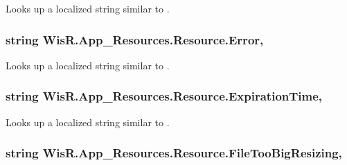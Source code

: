 Looks up a localized string similar to . 

\hypertarget{class_wis_r_1_1_app___resources_1_1_resource_a4486cffa4a7434f0dc98372bc596a455}{}
\subsubsection[{Error}]{\setlength{\rightskip}{0pt plus 5cm}string Wis\+R.\+App\+\_\+\+Resources.\+Resource.\+Error\hspace{0.3cm}{\ttfamily [static]}, {\ttfamily [get]}}\label{class_wis_r_1_1_app___resources_1_1_resource_a4486cffa4a7434f0dc98372bc596a455}


Looks up a localized string similar to . 

\hypertarget{class_wis_r_1_1_app___resources_1_1_resource_ab66b631e7db04b7054b799b76a04b245}{}
\subsubsection[{Expiration\+Time}]{\setlength{\rightskip}{0pt plus 5cm}string Wis\+R.\+App\+\_\+\+Resources.\+Resource.\+Expiration\+Time\hspace{0.3cm}{\ttfamily [static]}, {\ttfamily [get]}}\label{class_wis_r_1_1_app___resources_1_1_resource_ab66b631e7db04b7054b799b76a04b245}


Looks up a localized string similar to . 

\hypertarget{class_wis_r_1_1_app___resources_1_1_resource_ac60ef8ccb4d4d925c67924e267a752bd}{}
\subsubsection[{File\+Too\+Big\+Resizing}]{\setlength{\rightskip}{0pt plus 5cm}string Wis\+R.\+App\+\_\+\+Resources.\+Resource.\+File\+Too\+Big\+Resizing\hspace{0.3cm}{\ttfamily [static]}, {\ttfamily [get]}}\label{class_wis_r_1_1_app___resources_1_1_resource_ac60ef8ccb4d4d925c67924e267a752bd}



